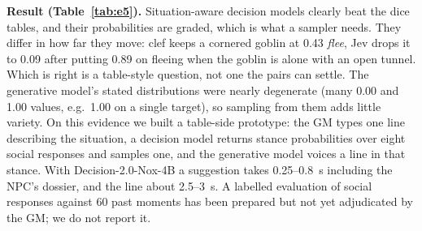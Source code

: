 \documentclass[11pt]{article}
\begin{document}
\begin{table}[t]
\centering
\small
{}
\caption{E5. Two pairs are imperfect: in one, clef's answer (an archer engaged in melee draws its
sword, \emph{attack secondary} 0.64) is arguably better than the expected \emph{maneuver}; in
another, the shared party description contradicted the scenario's premise, invalidating the pair for
all policies. The scenarios and expectations were written by the experimenter.}
\label{tab:e5}
\end{table}

\textbf{Result (Table~\ref{tab:e5}).} Situation-aware decision models clearly beat the dice tables,
and their probabilities are graded, which is what a sampler needs. They differ in how far they move:
clef keeps a cornered goblin at 0.43 \emph{flee}, Jev drops it to 0.09 after putting 0.89 on fleeing
when the goblin is alone with an open tunnel. Which is right is a table-style question, not one the pairs can
settle. The generative model's stated
distributions were nearly degenerate (many 0.00 and 1.00 values, e.g.\ 1.00 on a single target), so
sampling from them adds little variety. On this evidence we built a table-side prototype: the GM types
one line describing the situation, a decision model returns stance probabilities over eight social
responses and samples one, and the generative model voices a line in that stance. With
Decision-2.0-Nox-4B a suggestion takes 0.25--0.8~s including the NPC's dossier, and the line about
2.5--3~s. A labelled evaluation of social responses against 60 past moments has been prepared but
not yet adjudicated by the GM; we do not report it.
\end{document}
